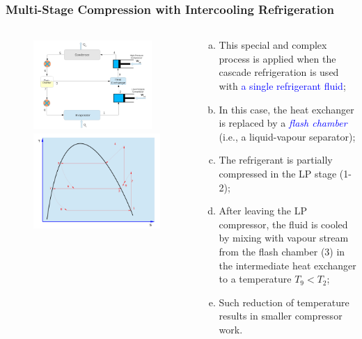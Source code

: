 \documentclass[10pt,compress]{beamer}
\begin{document}
\begin{frame}
 \frametitle{Multi-Stage Compression with Intercooling Refrigeration}
 \begin{columns}
  \begin{column}[c]{0.45\linewidth}
   \begin{figure}%
     \vbox{
      \includegraphics[width=4.5cm,height=3.5cm,clip]{./Pics/Overview_Refrig26}
      \vspace{-.1cm}
      \includegraphics[width=4.cm,height=4.cm,clip]{./Pics/Overview_Refrig27}}
   \end{figure}  
  \end{column}  
  \begin{column}[c]{0.55\linewidth}
   \begin{enumerate}[(a)]
    \item <1-> This special and complex process is applied when the cascade refrigeration is used with \textcolor{blue}{a single refrigerant fluid};
    \item <2-> In this case, the heat exchanger is replaced by a \textcolor{blue}{{\it flash chamber}} (i.e., a liquid-vapour separator);
    \item <3-> The refrigerant is partially compressed in the LP stage (1-2);
    \item <4-> After leaving the LP compressor, the fluid is cooled by mixing with vapour stream from the flash chamber (3) in the intermediate heat exchanger to a temperature $T_{9}<T_{2}$;
    \item <5-> Such reduction of temperature results in smaller compressor work.
   \end{enumerate}
  \end{column}  
 \end{columns} 
\end{frame}
\end{document}
